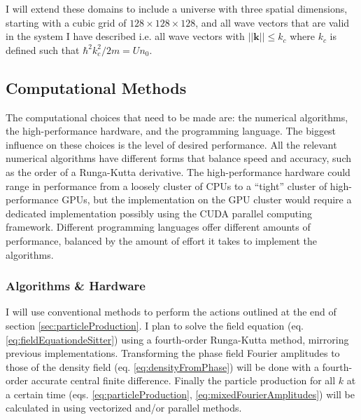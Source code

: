 \documentclass{article}
\begin{document}
                I will extend these domains to include a universe with three spatial dimensions, starting with a cubic grid of $128 \times 128 \times 128$, and all wave vectors that are valid in the system I have described i.e. all wave vectors with $||\mathbf{k}|| \leq k_c$ where $k_c$ is defined such that $\hbar^2 k_c^2 / 2 m = U n_0$.

        \subsection{Computational Methods}

            The computational choices that need to be made are: the numerical algorithms, the high-performance hardware, and the programming language.  The biggest influence on these choices is the level of desired performance.  All the relevant numerical algorithms have different forms that balance speed and accuracy, such as the order of a Runga-Kutta derivative.  The high-performance hardware could range in performance from a loosely cluster of CPUs to a ``tight'' cluster of high-performance GPUs, but the implementation on the GPU cluster would require a dedicated implementation possibly using the CUDA parallel computing framework.  Different programming languages offer different amounts of performance, balanced by the amount of effort it takes to implement the algorithms.

            \subsubsection{Algorithms \& Hardware}

                I will use conventional methods to perform the actions outlined at the end of section \ref{sec:particleProduction}.  I plan to solve the field equation (eq. \ref{eq:fieldEquationdeSitter}) using a fourth-order Runga-Kutta method, mirroring previous implementations\cite{Jain}.  Transforming the phase field Fourier amplitudes to those of the density field (eq. \ref{eq:densityFromPhase}) will be done with a fourth-order accurate central finite difference.  Finally the particle production for all $k$ at a certain time (eqs. \ref{eq:particleProduction}, \ref{eq:mixedFourierAmplitudes}) will be calculated in using vectorized and/or parallel methods.
    
\end{document}
